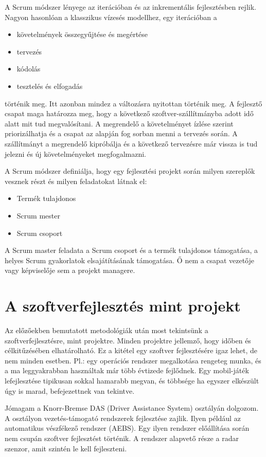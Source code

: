 \documentclass[a4paper,12pt,leqno, notitlepage]{article}%
\begin{document}
A Scrum módszer lényege az iterációban és az inkrementális fejlesztésben rejlik. Nagyon hasonlóan a klasszikus vízesés modellhez, egy iterációban a 
\begin{itemize}
	\item követelmények összegyűjtése és megértése
	\item tervezés
	\item kódolás
	\item tesztelés és elfogadás
\end{itemize}
történik meg. Itt azonban mindez a változásra nyitottan történik meg. A fejlesztő csapat maga határozza meg, hogy a következő szoftver-szállítmányba adott idő alatt mit tud megvalósítani. A megrendelő a követelményet ízlése szerint priorizálhatja és a csapat az alapján fog sorban menni  a tervezés során. A szállítmányt a megrendelő kipróbálja és a következő tervezésre már vissza is tud jelezni és új követelményeket megfogalmazni.

A Scrum módszer definiálja, hogy egy fejlesztési projekt során milyen szereplők vesznek részt és milyen feladatokat látnak el:

\begin{itemize}
	\item Termék tulajdonos
	\item Scrum mester
	\item Scrum csoport
\end{itemize}

A Scrum master feladata a Scrum csoport és a termék tulajdonos támogatása, a helyes Scrum gyakorlatok elsajátításának támogatása. Ő nem a csapat vezetője vagy képviselője sem a projekt managere. \cite{scrum_roles}
 
\section{A szoftver\-fejlesztés mint projekt}

Az előzőekben bemutatott metodológiák után most tekintsünk a szoftverfejlesztésre, mint projektre. Minden projektre jellemző, hogy időben és célkitűzésében elhatárolható. Ez a kitétel egy szoftver fejlesztésére igaz lehet, de nem minden esetben. Pl.: egy operációs rendszer megalkotása rengeteg munka, és a ma leggyakrabban használtak már több évtizede fejlődnek. Egy mobil-játék lefejlesztése tipikusan sokkal hamarabb megvan, és többsége ha egyszer elkészült úgy is marad, befejezettnek van tekintve.

Jómagam a Knorr-Bremse DAS (Driver Assistance System) osztályán dolgozom. A osztályon vezetés-támogató rendszerek fejlesztése zajlik. Ilyen például az automatikus vészfékező rendszer (AEBS). Egy ilyen rendszer előállítása során nem csupán szoftver fejlesztést történik. A rendszer alapvető része a radar szenzor, amit szintén le kell fejleszteni.

{}

\end{document}
